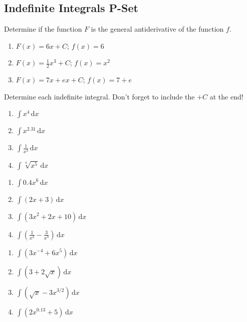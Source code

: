 \documentclass{article}
\newcounter{pset}
\newcommand{\dx}{\, \mathrm{d}x}
\newcommand{\dint}[1]{\displaystyle \int {#1} \dx}
\begin{document}
\subsection*{Indefinite Integrals P-Set}

Determine if the function $F$ is the general antiderivative of the function $f$.
\begin{multicols}{3}
\begin{enumerate}
    \item $F(x) = 6x + C$; $f(x) = 6$
    \item $F(x) = \frac{1}{2}x^3 + C$; $f(x) = x^2$
    \item $F(x) = 7x + ex + C$; $f(x) = 7 + e$
\end{enumerate}     \setcounter{pset}{\value{enumi}}
\end{multicols}
\smallskip 

Determine each indefinite integral. Don't forget to include the $+C$ at the end!
\begin{multicols}{4}
\begin{enumerate}   \setcounter{enumi}{\value{pset}}
    \item $\dint{x^4}$
    \item $\dint{x^{2.31}}$
    \item $\dint{\frac{1}{x^3}}$
    \item $\dint{\sqrt[4]{x^5}}$
\end{enumerate}     \setcounter{pset}{\value{enumi}}
\end{multicols}
\smallskip
\begin{multicols}{4}
\begin{enumerate}   \setcounter{enumi}{\value{pset}}
    \item $\dint{0.4x^6}$
    \item $\dint{(2x+3)}$
    \item $\dint{(3x^2+2x+10)}$
    \item $\dint{\left(\frac{1}{x^2}-\frac{3}{x^3}\right)}$
\end{enumerate}     \setcounter{pset}{\value{enumi}}
\end{multicols}
\smallskip
\begin{multicols}{4}
\begin{enumerate}   \setcounter{enumi}{\value{pset}}
    \item $\dint{\left(3x^{-4}+6x^5\right)}$
    \item $\dint{\left(3+2\sqrt{x}\right)}$
    \item $\dint{\left(\sqrt{x}-3x^{3/2}\right)}$
    \item $\dint{\left(2x^{0.13}+5\right)}$
\end{enumerate}     \setcounter{pset}{\value{enumi}}
\end{multicols}
\end{document}
